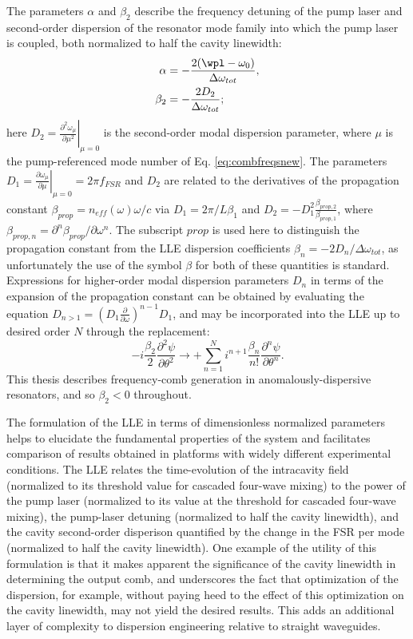 The parameters $\alpha$ and $\beta_2$ describe the frequency detuning of the pump laser and second-order dispersion of the resonator mode family into which the pump laser is coupled, both normalized to half the cavity linewidth: 
\begin{align}
\alpha&=-\frac{2(\wpl-\omega_0)}{\Delta\omega_{tot}},\\
\beta_2&=-\frac{2 D_2}{\Delta\omega_{tot}};
\end{align} here $D_2=\left.\frac{\partial^2\omega_\mu}{\partial \mu^2}\right|_{\mu=0}$ is the second-order modal dispersion parameter, where $\mu$ is the pump-referenced mode number of Eq. \ref{eq:combfreqsnew}. The parameters $D_1=\left.\frac{\partial\omega_\mu}{\partial\mu}\right|_{\mu=0}=2\pi f_{FSR}$ and $D_2$ are related to the derivatives of the propagation constant $\beta_{prop}=n_{eff}(\omega)\omega/c$ via $D_1=2\pi/L\beta_1$ and $D_2=-D_1^2\frac{\beta_{prop,2}}{\beta_{prop,1}}$, where $\beta_{prop,n}=\partial^n\beta_{prop}/\partial\omega^n$. The subscript $prop$ is used here to distinguish the propagation constant from the LLE dispersion coefficients $\beta_n=-2D_n/\Delta\omega_{tot}$, as unfortunately the use of the symbol $\beta$ for both of these quantities is standard. Expressions for higher-order modal dispersion parameters $D_n$ in terms of the expansion of the propagation constant can be obtained by evaluating the equation $D_{n>1}=(D_1\frac{\partial}{\partial \omega})^{n-1} D_1$, and may be incorporated into the LLE up to desired order $N$ through the replacement:
\begin{equation}
-i\frac{\beta_2}{2}\frac{\partial^2\psi}{\partial\theta^2}\rightarrow +\sum_{n=1}^N i^{n+1} \frac{\beta_n}{n!}\frac{\partial^n\psi}{\partial\theta^n}.
\end{equation}
This thesis describes frequency-comb generation in anomalously-dispersive resonators, and so $\beta_2<0$ throughout.

The formulation of the LLE in terms of dimensionless normalized parameters helps to elucidate the fundamental properties of the system and facilitates comparison of results obtained in platforms with widely different experimental conditions. The LLE relates the time-evolution of the intracavity field (normalized to its threshold value for cascaded four-wave mixing) to the power of the pump laser (normalized to its value at the threshold for cascaded four-wave mixing), the pump-laser detuning (normalized to half the cavity linewidth), and the cavity second-order disperison quantified by the change in the FSR per mode (normalized to half the cavity linewidth). One example of the utility of this formulation is that it makes apparent the significance of the cavity linewidth in determining the output comb, and underscores the fact that optimization of the dispersion, for example, without paying heed to the effect of this optimization on the cavity linewidth, may not yield the desired results. This adds an additional layer of complexity to dispersion engineering relative to straight waveguides.

